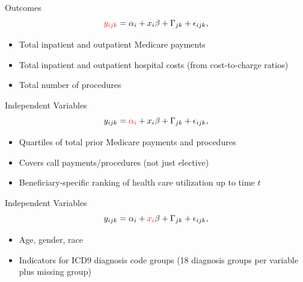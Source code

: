 \documentclass[t,aspectratio=169]{beamer}
\begin{document}
\begin{frame}{Outcomes}
    \begin{equation*}
        \textcolor{red}{y_{ijk}} = \alpha_{i} + x_{i}\beta + \Gamma_{jk} + \epsilon_{ijk},
    \end{equation*}

    \begin{itemize}
        \item Total inpatient and outpatient Medicare payments
        \item Total inpatient and outpatient hospital costs (from cost-to-charge ratios)
        \item Total number of procedures
    \end{itemize}
\end{frame}


\begin{frame}{Independent Variables}
    \begin{equation*}
        y_{ijk} = \textcolor{red}{\alpha_{i}} + x_{i}\beta + \Gamma_{jk} + \epsilon_{ijk},
    \end{equation*}

    \begin{itemize}
        \item Quartiles of total prior Medicare payments and procedures
        \item Covers call payments/procedures (not just elective)
        \item Beneficiary-specific ranking of health care utilization up to time $t$
    \end{itemize}
\end{frame}

\begin{frame}{Independent Variables}
    \begin{equation*}
        y_{ijk} = \alpha_{i} + \textcolor{red}{x_{i}}\beta + \Gamma_{jk} + \epsilon_{ijk},
    \end{equation*}

    \begin{itemize}
        \item Age, gender, race
        \item Indicators for ICD9 diagnosis code groups (18 diagnosis groups per variable plus missing group)
    \end{itemize}
\end{frame}
\end{document}
